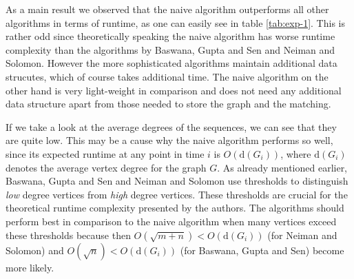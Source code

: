 \documentclass{article}      %
\begin{document}


\bigskip \noindent
As a main result we observed that the naive algorithm outperforms all other algorithms in terms of runtime, as one can easily see in table \ref{tab:exp-1}. This is rather odd since theoretically speaking the naive algorithm has worse runtime complexity than the algorithms by Baswana, Gupta and Sen and Neiman and Solomon. However the more sophisticated algorithms maintain additional data strucutes, which of course takes additional time. The naive algorithm on the other hand is very light-weight in comparison and does not need any additional data structure apart from those needed to store the graph and the matching. %

If we take a look at the average degrees of the sequences, we can see that they are quite low. This may be a cause why the naive algorithm performs so well, since its expected runtime at any point in time $i$ is $O(\mathrm{d}(G_i))$, where $\mathrm{d}(G_i)$ denotes the average vertex degree for the graph $G$. %
As already mentioned earlier, Baswana, Gupta and Sen and Neiman and Solomon use thresholds to distinguish \emph{low} degree vertices from \emph{high} degree vertices. These thresholds are crucial for the theoretical runtime complexity presented by the authors. The algorithms should perform best in comparison to the naive algorithm when many vertices exceed these thresholds because then $O(\sqrt{m+n}) < O(\mathrm{d}(G_i))$ (for Neiman and Solomon) and $O(\sqrt{n}) < O(\mathrm{d}(G_i))$ (for Baswana, Gupta and Sen) become more likely.

\end{document}
